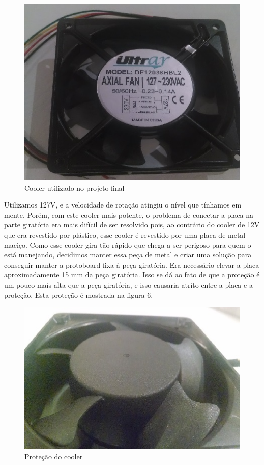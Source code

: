 \begin{figure}[!h]
	\centering
	\includegraphics{./cooler1.jpg}
	\caption[Cooler utilizado no projeto final]{Cooler utilizado no projeto final}
	\label{fig:cooler_Ultrar}
\end{figure}


Utilizamos 127V, e a velocidade de rotação atingiu o nível que tínhamos em mente. Porém, com este cooler mais potente, o problema de conectar a placa na parte giratória era mais difícil de ser resolvido pois, ao contrário do cooler de 12V que era revestido por plástico, esse cooler é revestido por uma placa de metal maciço. Como esse cooler gira tão rápido que chega a ser perigoso para quem o está manejando, decidimos manter essa peça de metal e criar uma solução para conseguir manter a protoboard fixa à peça giratória. Era necessário elevar a placa aproximadamente 15 mm da peça giratória. Isso se dá ao fato de que a proteção é um pouco mais alta que a peça giratória, e isso causaria atrito entre a placa e a proteção. Esta proteção é mostrada na figura 6.

\begin{figure}[!h]
	\centering
	\includegraphics{./cooler2.jpg}
	\caption[Proteção do cooler]{Proteção do cooler}
	\label{fig:cooler_protecao}
\end{figure}

